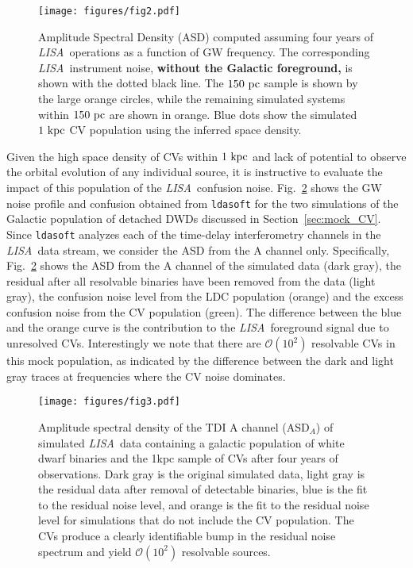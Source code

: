 \documentclass[fleqn,usenatbib]{mnras}
\newcommand{\lisa}{{\it LISA}}
\begin{document}
\begin{figure}
	\texttt{[image: figures/fig2.pdf]}
    \caption{Amplitude Spectral Density (ASD) computed assuming four years of \lisa\ operations as a function of GW frequency. The corresponding \lisa\ instrument noise, \textbf{without the Galactic foreground,} is shown with the dotted black line. The $150~\rm{pc}$ \citet{pala20} sample is shown by the large orange circles, while the remaining simulated systems within $150~\rm{pc}$ are shown in orange. Blue dots show the simulated $1~\rm{kpc}$ CV population using the inferred \citet{pala20} space density.}
    \label{fig:asd}
\end{figure}


Given the high space density of CVs within $1~\rm{kpc}$ and lack of potential to observe the orbital evolution of any individual source, it is instructive to evaluate the impact of this population of the \lisa\ confusion noise. 
Fig.~\ref{fig:isd} shows the GW noise profile and confusion obtained from \texttt{ldasoft} \citep{ldasoft} for the two simulations of the Galactic population of detached DWDs discussed in Section~\ref{sec:mock_CV}. Since \texttt{ldasoft} analyzes each of the time-delay interferometry channels in the \lisa\ data stream, we consider the ASD from the A channel only. Specifically, Fig.~\ref{fig:isd} shows the ASD from the A channel of the simulated data (dark gray), the residual after all resolvable binaries have been removed from the data (light gray), the confusion noise level from the LDC population (orange) and the excess confusion noise from the CV population (green). The difference between the blue and the orange curve is the contribution to the \lisa\ foreground signal due to unresolved CVs. Interestingly we note that there are $\mathcal{O}(10^2)$ resolvable CVs in this mock population, as indicated by the difference between the dark and light gray traces at frequencies where the CV noise dominates.

\begin{figure}
	\texttt{[image: figures/fig3.pdf]}
    \caption{Amplitude spectral density of the TDI A channel (ASD$_A$)  of simulated \lisa\ data containing a galactic population of white dwarf binaries and the 1kpc sample of CVs after four years of observations. Dark gray is the original simulated data, light gray is the residual data after removal of detectable binaries, blue is the fit to the residual noise level, and orange is the fit to the residual noise level for simulations that do not include the CV population. The CVs produce a clearly identifiable bump in the residual noise spectrum and yield $\mathcal{O}(10^2)$ resolvable sources.}
    \label{fig:isd}
\end{figure}
\end{document}
